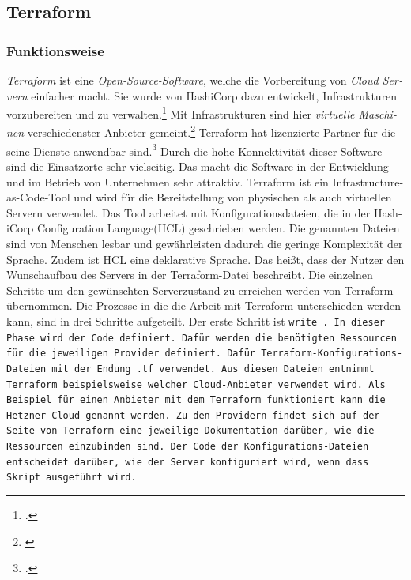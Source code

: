 \subsection{Terraform}
\begin{otherlanguage}{ngerman}
\subsubsection{Funktionsweise}
\textit{Terraform} ist eine \textit{Open-Source-Software}, welche die Vorbereitung von \textit{Cloud Servern} einfacher macht. Sie wurde von HashiCorp dazu entwickelt, Infrastrukturen vorzubereiten und zu verwalten.\footcite{introform} Mit Infrastrukturen sind hier \textit{virtuelle Maschinen} verschiedenster Anbieter gemeint.\footnote{\cite{Terraform}} Terraform hat lizenzierte Partner für die seine Dienste anwendbar sind.\footcite{TerraProviders} Durch die hohe Konnektivität dieser Software sind die Einsatzorte sehr vielseitig. Das macht die Software in der Entwicklung und im Betrieb von Unternehmen sehr attraktiv. 
\newline
\newline
Terraform ist ein Infrastructure-as-Code-Tool und wird für die Bereitstellung von physischen als auch virtuellen Servern verwendet. Das Tool arbeitet mit Konfigurationsdateien, die in der HashiCorp Configuration Language(HCL) geschrieben werden. Die genannten Dateien sind von Menschen lesbar und gewährleisten dadurch die geringe Komplexität der Sprache. Zudem ist HCL eine deklarative Sprache. Das heißt, dass der Nutzer den Wunschaufbau des Servers in der Terraform-Datei beschreibt. Die einzelnen Schritte um den gewünschten Serverzustand zu erreichen werden von Terraform übernommen. 
\newline
Die Prozesse in die die Arbeit mit Terraform unterschieden werden kann, sind in drei Schritte aufgeteilt. Der erste Schritt ist \tt write \rm. In dieser Phase wird der Code definiert. Dafür werden die benötigten Ressourcen für die jeweiligen Provider definiert. Dafür Terraform-Konfigurations-Dateien mit der Endung \tt .tf \rm verwendet. Aus diesen Dateien entnimmt Terraform beispielsweise welcher Cloud-Anbieter verwendet wird. Als Beispiel für einen Anbieter mit dem Terraform funktioniert kann die \dq Hetzner-Cloud \dq{} genannt werden. Zu den Providern findet sich auf der Seite von Terraform eine jeweilige Dokumentation darüber, wie die Ressourcen einzubinden sind. Der Code der Konfigurations-Dateien entscheidet darüber, wie der Server konfiguriert wird, wenn dass Skript ausgeführt wird. 

\end{otherlanguage}
